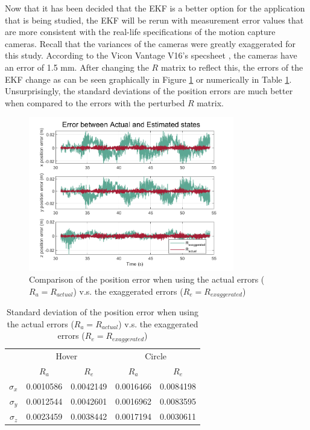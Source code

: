 \documentclass[letterpaper, paper,11pt]{AAS}	%
\begin{document}
Now that it has been decided that the EKF is a better option for the application that is being studied, the EKF will be rerun with measurement error values that are more consistent with the real-life specifications of the motion capture cameras. Recall that the variances of the cameras were greatly exaggerated for this study. According to the Vicon Vantage V16's specsheet \cite{vicon_2022}, the cameras have an error of 1.5 mm. After changing the $R$ matrix to reflect this, the errors of the EKF change as can be seen graphically in Figure \ref{fig:NewSigma} or numerically in Table \ref{tab:NewSigma}. Unsurprisingly, the standard deviations of the position errors are much better when compared to the errors with the perturbed $R$ matrix.

\begin{figure}[H]
	\centering\includegraphics[width=0.8\textwidth]{../_BAK_err}
	\caption{Comparison of the position error when using the actual errors ($R_a=R_{actual}$) v.s. the exaggerated errors ($R_{e}=R_{exaggerated}$)}
	\label{fig:NewSigma}
\end{figure}

\begin{table}[H]
\centering
\caption{Standard deviation of the position error when using the actual errors ($R_a=R_{actual}$) v.s. the exaggerated errors ($R_{e}=R_{exaggerated}$)}
\label{tab:NewSigma}
\begin{tabular}{|r|ll|ll|}
\hline
\multirow{2}{*}{\ } & \multicolumn{2}{c|}{Hover} & \multicolumn{2}{c|}{Circle} \\ \cline{2-5} 
 & \multicolumn{1}{c|}{$R_{a}$} & \multicolumn{1}{c|}{$R_{e}$} & \multicolumn{1}{c|}{$R_{a}$} & \multicolumn{1}{c|}{$R_{e}$} \\ \hline
$\sigma_x$ & \multicolumn{1}{l|}{0.0010586} & 0.0042149 & \multicolumn{1}{l|}{0.0016466} & 0.0084198 \\ \hline
$\sigma_y$ & \multicolumn{1}{l|}{0.0012544} & 0.0042601 & \multicolumn{1}{l|}{0.0016962} & 0.0083595 \\ \hline
$\sigma_z$ & \multicolumn{1}{l|}{0.0023459} & 0.0038442 & \multicolumn{1}{l|}{0.0017194} & 0.0030611 \\ \hline
\end{tabular}
\end{table}
\end{document}

